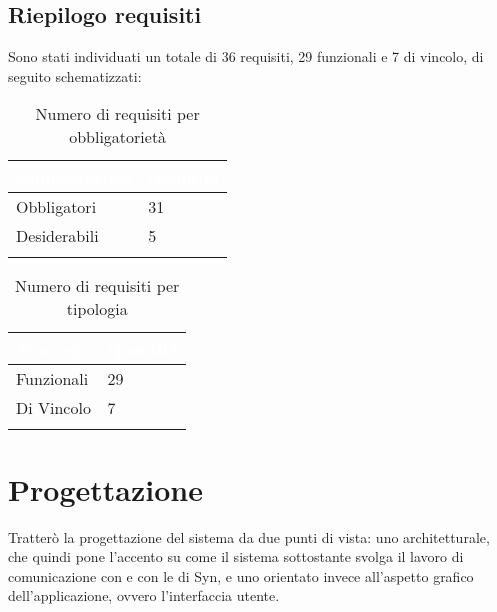 \subsection{Riepilogo requisiti}
Sono stati individuati un totale di 36 requisiti, 29 funzionali e 7 di vincolo, di seguito schematizzati:
{
    \setlength{\freewidth}{\dimexpr\textwidth-10\tabcolsep}
    \renewcommand{\arraystretch}{1.5}
    \centering
    \setlength{\aboverulesep}{0pt}
    \setlength{\belowrulesep}{0pt}
    \begin{longtable}{C{.25\freewidth} C{.2\freewidth}} 
       \toprule
    \textcolor{white}{\textbf{Obbligatorietà}}&
    \textcolor{white}{\textbf{Quantità}}\\
    \toprule
    \endhead

    Obbligatori & 31\\
    Desiderabili & 5\\
    \bottomrule
    \caption{Numero di requisiti per obbligatorietà}
    \label{tab:requisiti-obbligatorieta}
    \end{longtable}
}

{
    \setlength{\freewidth}{\dimexpr\textwidth-10\tabcolsep}
    \renewcommand{\arraystretch}{1.5}
    \centering
    \setlength{\aboverulesep}{0pt}
    \setlength{\belowrulesep}{0pt}
    \begin{longtable}{C{.25\freewidth} C{.2\freewidth}} 
       \toprule
    \textcolor{white}{\textbf{Tipologia}}&
    \textcolor{white}{\textbf{Quantità}}\\
    \toprule
    \endhead

    Funzionali & 29\\
    Di Vincolo & 7\\
    \bottomrule
    \caption{Numero di requisiti per tipologia}
    \label{tab:requisiti-tipolgia}
    \end{longtable}
}



\section{Progettazione}
Tratterò la progettazione del sistema da due punti di vista: uno architetturale, che quindi pone l'accento su come il sistema sottostante svolga il lavoro di comunicazione con \asa{} e con le \api{} di Syn, e uno orientato invece all'aspetto grafico dell'applicazione, ovvero l'interfaccia utente.

